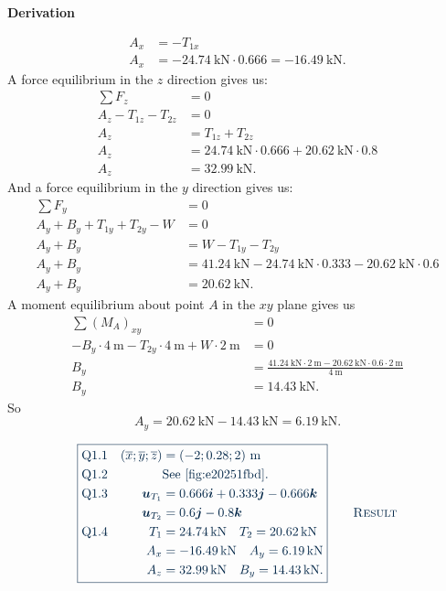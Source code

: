 \documentclass[a4paper]{article}
\renewcommand{\Vec}[1]{\boldsymbol{#1}}
\numberwithin{equation}{problem}
\newcommand{\AUheading}[1]{%
  \par\vspace{.4\baselineskip}%
  {\sffamily\bfseries\color{AUblueDark}#1\par}%
  \nobreak%
}
\newenvironment{derivation}[1][Derivation]{%
  \AUheading{#1}
  \begingroup\allowdisplaybreaks
  \setlength{\abovedisplayskip}{6pt}%
  \setlength{\belowdisplayskip}{6pt}%
  \setlength{\abovedisplayshortskip}{4pt}%
  \setlength{\belowdisplayshortskip}{4pt}%
}{\par\endgroup\medskip}
\newcommand{\finalresult}[1]{%
  \vspace{.2\baselineskip}%
  \begin{equation}
    {\color{AUblueDark}\boxed{\displaystyle #1}}
    \tag*{\textsc{\textcolor{AUblueDark}{Result}}}
  \end{equation}
  \newpage
}
\begin{document}
\begin{derivation}
\begin{itemize}
\begin{align*}
        A_x &= - T_{1x} \\
        A_x &= - \qty{24,74}{\kN} \cdot  \num{0,666} = \qty{-16,49}{\kN} 
      .\end{align*}
      A force equilibrium in the $z$ direction gives us:
      \begin{align*}
        \sum F_z &= 0 \\
        A_z - T_{1z} - T_{2z} &= 0 \\
        A_z &= T_{1z} + T_{2z} \\
        A_z &= \qty{24,74}{\kN} \cdot \num{0,666} + \qty{20,62}{\kN} \cdot \num{0,8} \\
        A_z &= \qty{32,99}{\kN} 
      .\end{align*}
      And a force equilibrium in the $y$ direction gives us:
      \begin{align*}
        \sum F_y &= 0 \\
        A_y + B_y + T_{1y} + T_{2y} - W &= 0 \\
        A_y + B_y &= W - T_{1y} - T_{2y} \\
        A_y + B_y &= \qty{41,24}{\kN} - \qty{24,74}{\kN} \cdot \num{0,333} - \qty{20,62}{\kN} \cdot \num{0,6}  \\
        A_y + B_y &= \qty{20,62}{\kN}
      .\end{align*}
      A moment equilibrium about point $A$ in the $xy$ plane gives us
      \begin{align*}
        \sum \left( M_A \right)_{xy} &= 0 \\
        - B_y \cdot \qty{4}{\m} - T_{2y} \cdot \qty{4}{\m} + W \cdot \qty{2}{\m} &= 0 \\
        B_y &= \frac{\qty{41,24}{\kN}  \cdot \qty{2}{\m} - \qty{20,62}{\kN} \cdot \num{0,6} \cdot \qty{2}{\m} }{\qty{4}{\m}} \\
        B_y &= \qty{14,43}{\kN}
      .\end{align*}
      So
      \begin{equation*}
        A_y = \qty{20,62}{\kN} - \qty{14,43}{\kN } = \qty{6,19}{\kN} 
      .\end{equation*}
    \end{itemize}
    \end{derivation}

    \finalresult{
      \begin{aligned}
        &\mathrm{Q1.1} & (\overline{x}; \overline{y}; \overline{z}) &= \left( -2;  \num{0,28}; 2 \right) \, \unit{\m} \\
        &\mathrm{Q1.2} & &\text{See \Cref{fig:e20251fbd}}. \\
        &\mathrm{Q1.3} & \Vec{u}_{T_1} &= \num{0,666} \Vec{i} + \num{0,333} \Vec{j} - \num{0,666} \Vec{k}  \\
        && \Vec{u}_{T_2} &= \num{0,6} \Vec{j} - \num{0,8} \Vec{k} \\
        &\mathrm{Q1.4} & T_1 &= \qty{24,74}{\kN} \quad T_2 = \qty{20,62}{\kN}  \\
        && A_x &= - \qty{16,49}{\kN}  \quad A_y = \qty{6,19}{\kN}  \\
        && A_z &= \qty{32,99}{\kN}  \quad B_y = \qty{14,43}{\kN}
      .\end{aligned}
    }
\end{document}
